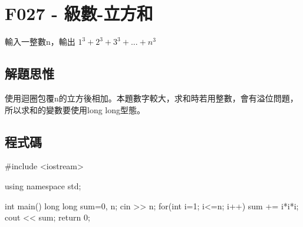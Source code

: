 \section{F027 - 級數-立方和}
輸入一整數n，輸出 $1^3+2^3+3^3+...+n^3$
\subsection{解題思惟}
使用迴圈包覆n的立方後相加。本題數字較大，求和時若用整數，會有溢位問題，
所以求和的變數要使用long long型態。
\subsection{程式碼}
\begin{cppcode}
#include <iostream>

using namespace std;

int main()
{
	long long sum=0, n;
	cin >> n;
	for(int i=1; i<=n; i++) {
		sum += i*i*i;
	} 
	cout << sum;
	return 0;
}
\end{cppcode}
